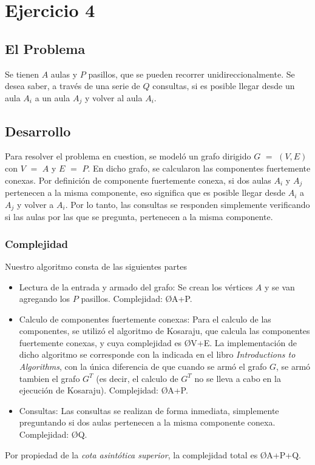 \section{Ejercicio 4}
\subsection{El Problema}
Se tienen $A$ aulas y $P$ pasillos, que se pueden recorrer unidireccionalmente. Se desea saber, a través de una serie de $Q$ consultas, si es posible llegar desde un aula $A_{i}$ a un aula $A_{j}$ y volver al aula $A_{i}$.

\subsection{Desarrollo}
Para resolver el problema en cuestion, se modeló un grafo dirigido $G$ $=$ $(V,E)$ con $V$ $=$ $A$ y $E$ $=$ $P$.
En dicho grafo, se calcularon las componentes fuertemente conexas.
Por definición de componente fuertemente conexa, si dos aulas $A_{i}$ y $A_{j}$ pertenecen a la misma componente, eso significa que es posible llegar desde $A_{i}$ a $A_{j}$ y volver a $A_{i}$\textsuperscript{\cite{cfc}}.
Por lo tanto, las consultas se responden simplemente verificando si las aulas por las que se pregunta, pertenecen a la misma componente.

\subsubsection{Complejidad}
Nuestro algoritmo consta de las siguientes partes
\begin{itemize}
	\item Lectura de la entrada y armado del grafo: Se crean los vértices $A$ y se van agregando los $P$ pasillos. Complejidad: \O{A+P}.
	\item Calculo de componentes fuertemente conexas: Para el calculo de las componentes, se utilizó el algoritmo de Kosaraju, que calcula las componentes fuertemente conexas, y cuya complejidad es \O{V+E}\textsuperscript{\cite{cormen}}. La implementación de dicho algoritmo se corresponde con la indicada en el libro \emph{Introductions to Algorithms}\textsuperscript{\cite{cormen}}, con la única diferencia de que cuando se armó el grafo $G$, se armó tambien el grafo $G^T$ (es decir, el calculo de $G^T$ no se lleva a cabo en la ejecución de Kosaraju). Complejidad: \O{A+P}.
	\item Consultas: Las consultas se realizan de forma inmediata, simplemente preguntando si dos aulas pertenecen a la misma componente conexa. Complejidad: \O{Q}.
\end{itemize}

Por propiedad de la \emph{cota asintótica superior}, la complejidad total es \O{A+P+Q}.